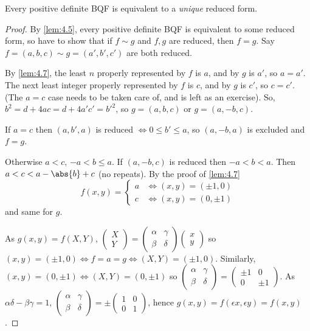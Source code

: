 \documentclass{article}
\begin{document}
\begin{nthm}\label{thm:4.8}
    Every positive definite BQF is equivalent to a \emph{unique} reduced form.
\end{nthm}

\begin{proof}
    By \cref{lem:4.5}, every positive definite BQF is equivalent to some reduced form, so have to show that if $f \sim g$ and $f, g$ are reduced, then $f = g$.
    Say $f = (a, b, c) \sim g=(a', b', c')$ are both reduced.

    By \cref{lem:4.7}, the least $n$ properly represented by $f$ is $a$, and by $g$ is $a'$, so $a = a'$.
    The next least integer properly represented by $f$ is $c$, and by $g$ is $c'$, so $c = c'$.
    (The $a=c$ case needs to be taken care of, and is left as an exercise).
    So, $b^2 = d + 4ac = d + 4a'c' = b'^2$, so $g = (a, b, c)$ or $g = (a, -b, c)$.

    If $a = c$ then $(a, b', a)$ is reduced $\iff 0 \leq b' \leq a$, so $(a, -b, a)$ is excluded and $f = g$.

    Otherwise $a < c$, $-a < b \leq a$.
    If $(a, -b, c)$ is reduced then $-a < b < a$.
    Then $a < c < a - \abs{b} + c$ (no repeats).
    By the proof of \cref{lem:4.7}
    \begin{equation*}
        f(x, y) =
        \begin{cases}
            a & \iff (x, y) = (\pm 1, 0) \\
            c & \iff (x, y) = (0, \pm 1)
        \end{cases}
    \end{equation*}
    and same for $g$.

    As $g(x, y) = f(X, Y)$, $\begin{pmatrix} X \\ Y \end{pmatrix}=\begin{pmatrix}\alpha & \gamma \\ \beta & \delta\end{pmatrix} \begin{pmatrix} x \\ y\end{pmatrix}$ so $(x, y) = (\pm 1, 0) \iff f=a=g \iff (X, Y) = (\pm 1, 0)$.
    Similarly, $(x,y) = (0, \pm 1) \iff (X, Y) = (0, \pm 1)$ so $\begin{pmatrix}\alpha & \gamma \\ \beta & \delta\end{pmatrix} = \begin{pmatrix}\pm 1 & 0 \\ 0 & \pm 1\end{pmatrix}$.
    As $\alpha \delta - \beta \gamma = 1$, $\begin{pmatrix}\alpha & \gamma \\ \beta & \delta\end{pmatrix} = \pm \begin{pmatrix}1 & 0 \\ 0 & 1 \end{pmatrix}$, hence $g(x, y) = f(\epsilon x, \epsilon y) = f(x, y)$.
\end{proof}
\end{document}
